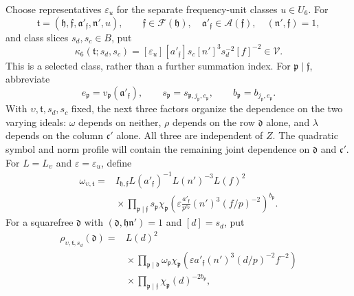 Choose representatives \(\varepsilon_u\) for the separate frequency-unit
classes \(u\in U_6\).  For
\[
 \mathfrak t=(\mathfrak h,\mathfrak f,\mathfrak a'_{\mathfrak f},
              \mathfrak n',u),\qquad
 \mathfrak f\in\mathcal F(\mathfrak h),\quad
 \mathfrak a'_{\mathfrak f}\in\mathcal A(\mathfrak f),\quad
 (\mathfrak n',\mathfrak f)=1,
\]
and class slices \(s_d,s_c\in B\), put
\begin{equation}\label{eq:reflection-profile-class}
 \kappa_6(\mathfrak t;s_d,s_c)
   =[\varepsilon_u][a'_{\mathfrak f}]s_c[n']^3
        s_d^{-2}[f]^{-2}\in\mathcal V.
\end{equation}
This is a selected class, rather than a further summation index.  For
\(\mathfrak p\mid\mathfrak f\), abbreviate
\[
 e_{\mathfrak p}=v_{\mathfrak p}(\mathfrak a'_{\mathfrak f}),\qquad
 s_{\mathfrak p}=s_{\mathfrak p,j_{\mathfrak p},e_{\mathfrak p}},\qquad
 b_{\mathfrak p}=b_{j_{\mathfrak p},e_{\mathfrak p}}.
\]
With \(\upsilon,\mathfrak t,s_d,s_c\) fixed, the next three factors organize the
dependence on the two varying ideals: \(\omega\) depends on neither,
\(\rho\) depends on the row \(\mathfrak d\) alone, and \(\lambda\) depends
on the column \(\mathfrak c'\) alone.  All three are independent of \(Z\).
The quadratic symbol and norm profile will contain the remaining joint
dependence on \(\mathfrak d\) and \(\mathfrak c'\).
For \(L=L_\upsilon\) and \(\varepsilon=\varepsilon_u\), define
\begin{equation}\label{eq:reflection-frozen-factor}
\begin{split}
 \omega_{\upsilon,\mathfrak t}
  ={}&I_{\mathfrak h,\mathfrak f}
       L(a'_{\mathfrak f})^{-1}L(n')^{-3}L(f)^2\\
    &{}\times\prod_{\mathfrak p\mid\mathfrak f}
       s_{\mathfrak p}
       \chi_{\mathfrak p}\!\left(
         \varepsilon\frac{a'_{\mathfrak f}}{p^{e_{\mathfrak p}}}
         (n')^3(f/p)^{-2}\right)^{b_{\mathfrak p}}.
\end{split}
\end{equation}
For a squarefree \(\mathfrak d\) with
\((\mathfrak d,\mathfrak h\mathfrak n')=1\) and \([d]=s_d\), put
\begin{equation}\label{eq:reflection-row-factor}
\begin{split}
 \rho_{\upsilon,\mathfrak t,s_d}(\mathfrak d)
  ={}&L(d)^2\\
    &{}\times\prod_{\mathfrak p\mid\mathfrak d}
        \omega_{\mathfrak p}
        \chi_{\mathfrak p}\!\left(
           \varepsilon a'_{\mathfrak f}(n')^3(d/p)^{-2}f^{-2}\right)\\
    &{}\times\prod_{\mathfrak p\mid\mathfrak f}
              \chi_{\mathfrak p}(d)^{-2b_{\mathfrak p}},
\end{split}
\end{equation}
